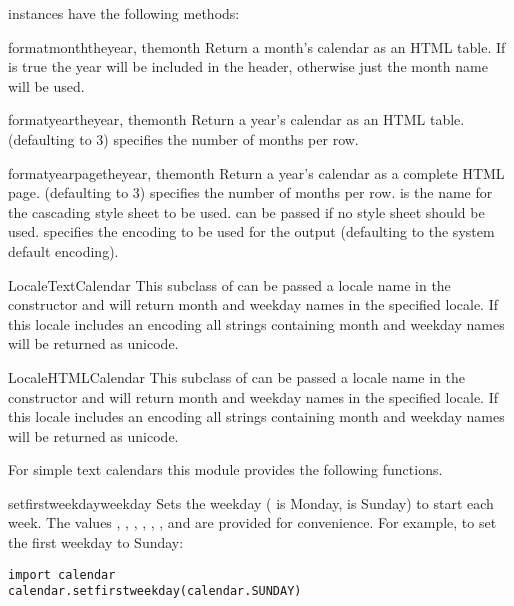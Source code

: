  instances have the following methods:

\begin{methoddesc}{formatmonth}{theyear, themonth}
Return a month's calendar as an HTML table. If  is
true the year will be included in the header, otherwise just the
month name will be used.
\end{methoddesc}

\begin{methoddesc}{formatyear}{theyear, themonth}
Return a year's calendar as an HTML table.  (defaulting to 3)
specifies the number of months per row.
\end{methoddesc}

\begin{methoddesc}{formatyearpage}{theyear, themonth}
Return a year's calendar as a complete HTML page. 
(defaulting to 3) specifies the number of months per row. 
is the name for the cascading style sheet to be used. 
can be passed if no style sheet should be used. 
specifies the encoding to be used for the output (defaulting
to the system default encoding).
\end{methoddesc}


\begin{classdesc}{LocaleTextCalendar}{}
This subclass of  can be passed a locale name in the
constructor and will return month and weekday names in the specified locale.
If this locale includes an encoding all strings containing month and weekday
names will be returned as unicode.
\end{classdesc}


\begin{classdesc}{LocaleHTMLCalendar}{}
This subclass of  can be passed a locale name in the
constructor and will return month and weekday names in the specified locale.
If this locale includes an encoding all strings containing month and weekday
names will be returned as unicode.
\end{classdesc}


For simple text calendars this module provides the following functions.

\begin{funcdesc}{setfirstweekday}{weekday}
Sets the weekday ( is Monday,  is Sunday) to start
each week. The values , ,
, , ,
, and  are provided for
convenience. For example, to set the first weekday to Sunday:

\begin{verbatim}
import calendar
calendar.setfirstweekday(calendar.SUNDAY)
\end{verbatim}
\end{funcdesc}


